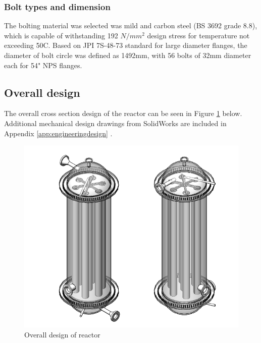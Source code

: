 \subsubsection{Bolt types and dimension}
The bolting material was selected was mild and carbon steel (BS 3692 grade 8.8), which is capable of withstanding 192 $N/mm^2$ design stress for temperature not exceeding 50C. Based on JPI 7S-48-73 standard for large diameter flanges, the diameter of bolt circle was defined as 1492mm, with 56 bolts of 32mm diameter each for 54" NPS flanges. 

\subsection{Overall design}
The overall cross section design of the reactor can be seen in Figure \ref{fig:mainreactor} below. Additional mechanical design drawings from SolidWorks are included in Appendix \ref{app:engineeringdesign} .
\begin{figure}[h]
    \centering
    \includegraphics[width=0.8\linewidth]{chapters/2-reaction/figures/FYD reactor poster boy both.PNG}
    \caption{Overall design of reactor}
    \label{fig:mainreactor}
\end{figure}

